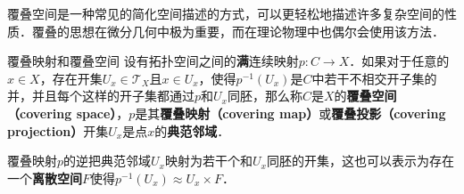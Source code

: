 

覆叠空间是一种常见的简化空间描述的方式，可以更轻松地描述许多复杂空间的性质．覆叠的思想在微分几何中极为重要，而在理论物理中也偶尔会使用该方法．

\begin{definition}{覆叠映射和覆叠空间}
设有拓扑空间之间的\textbf{满}连续映射$p:C\rightarrow X$．如果对于任意的$x\in X$，存在开集$U_x\in\mathcal{T}_X$且$x\in U_x$，使得$p^{-1}(U_x)$是$C$中若干不相交开子集的并，并且每个这样的开子集都通过$p$和$U_x$同胚，那么称$C$是$X$的\textbf{覆叠空间（covering space）}，$p$是其\textbf{覆叠映射（covering map）}或\textbf{覆叠投影（covering projection）}开集$U_x$是点$x$的\textbf{典范邻域}．
\end{definition} 

覆叠映射$p$的逆把典范邻域$U_x$映射为若干个和$U_x$同胚的开集，这也可以表示为存在一个\textbf{离散空间}$F$使得$p^{-1}(U_x)\approx U_x\times F$．

